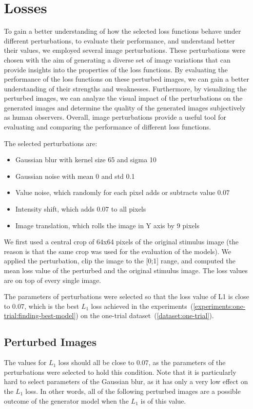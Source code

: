 \section{Losses}
\label{experiments:losses}
To gain a better understanding of how the selected loss functions behave under different perturbations, to evaluate their performance, and understand better their values, we employed several image perturbations. These perturbations were chosen with the aim of generating a diverse set of image variations that can provide insights into the properties of the loss functions. By evaluating the performance of the loss functions on these perturbed images, we can gain a better understanding of their strengths and weaknesses. Furthermore, by visualizing the perturbed images, we can analyze the visual impact of the perturbations on the generated images and determine the quality of the generated images subjectively as human observers. Overall, image perturbations provide a useful tool for evaluating and comparing the performance of different loss functions.

The selected perturbations are:
\begin{itemize}
    \item Gaussian blur with kernel size 65 and sigma 10
    \item Gaussian noise with mean 0 and std 0.1
    \item Value noise, which randomly for each pixel adds or subtracts value 0.07
    \item Intensity shift, which adds 0.07 to all pixels
    \item Image translation, which rolls the image in Y axis by 9 pixels
\end{itemize}

We first used a central crop of 64x64 pixels of the original stimulus image (the reason is that the same crop was used for the evaluation of the models). We applied the perturbation, clip the image to the [0;1] range, and computed the mean loss value of the perturbed and the original stimulus image. The loss values are on top of every single image.

The parameters of perturbations were selected so that the loss value of L1 is close to $0.07$, which is the best $L_1$ loss achieved in the experiments~(\ref{experiments:one-trial:finding-best-model}) on the one-trial dataset~(\ref{dataset:one-trial}).


\subsection{Perturbed Images}
\label{experiments:losses:L1}
The values for $L_1$ loss should all be close to $0.07$, as the parameters of the perturbations were selected to hold this condition. Note that it is particularly hard to select parameters of the Gaussian blur, as it has only a very low effect on the $L_1$ loss. In other words, all of the following perturbed images are a possible outcome of the generator model when the $L_1$ is of this value.

